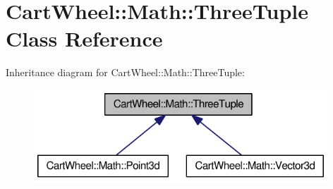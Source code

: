 \hypertarget{classCartWheel_1_1Math_1_1ThreeTuple}{
\section{CartWheel::Math::ThreeTuple Class Reference}
\label{classCartWheel_1_1Math_1_1ThreeTuple}
}


Inheritance diagram for CartWheel::Math::ThreeTuple:\nopagebreak
\begin{figure}[H]
\begin{center}
\leavevmode
\includegraphics[width=312pt]{classCartWheel_1_1Math_1_1ThreeTuple__inherit__graph}
\end{center}
\end{figure}
